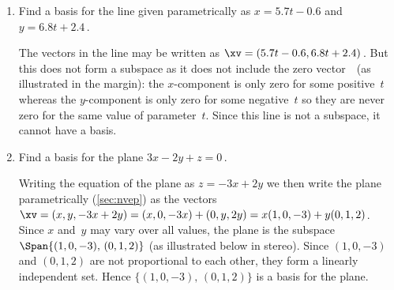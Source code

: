 \begin{example}
\begin{enumerate}
\item Find a basis for the line given parametrically as \(x=5.7t-0.6\) and \(y=6.8t+2.4\)\,.
\begin{solution} 
The vectors in the line may be written as \(\xv=(5.7t-0.6,6.8t+2.4)\)\,.
But this does not form a subspace as it does not include the zero vector~\ov\ (as illustrated in the margin): 
the \(x\)-component is only zero for some positive~\(t\) whereas the \(y\)-component is only zero for some negative~\(t\) so they are never zero for the same value of parameter~\(t\).
Since this line is not a subspace, it cannot have a basis.
\end{solution}




\item Find a basis for the plane \(3x-2y+z=0\)\,.
\begin{solution} 
Writing the equation of the plane as \(z=-3x+2y\) we then write the plane parametrically (\autoref{sec:nvep}) as the vectors \(\xv=(x,y,-3x+2y) =(x,0,-3x)+(0,y,2y) =x(1,0,-3) +y(0,1,2)\).
Since \(x\) and~\(y\) may vary over all values, the plane is the subspace \(\Span\{(1,0,-3),\,(0,1,2)\}\) (as illustrated below in stereo).
Since \((1,0,-3)\) and \((0,1,2)\) are not proportional to each other, they form a linearly independent set.
Hence \(\{(1,0,-3),\,(0,1,2)\}\) is a basis for the plane.
\begin{center}
 {}
\end{center}
\end{solution}





\end{enumerate}
\end{example}
